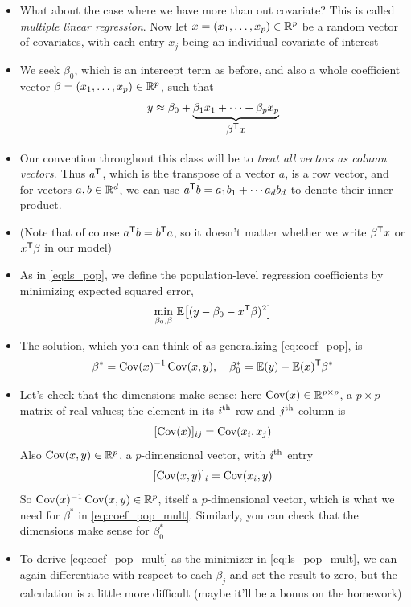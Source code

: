 \documentclass{article}
\begin{document}
\begin{itemize}
\item What about the case where we have more than out covariate? This is called
  \emph{multiple linear regression}. Now let $x = (x_1, \dots, x_p) \in \mathbb{R}^p$
  be a random vector of covariates, with each entry $x_j$ being an individual
  covariate of interest

\item We seek $\beta_0$, which is an intercept term as before, and also a whole 
  coefficient vector $\beta = (x_1, \dots, x_p) \in \mathbb{R}^p$, such that 
  \[
  y \approx \beta_0 + \underbrace{\beta_1 x_1 + \cdots + \beta_p
    x_p}_{\textstyle \begin{array}{c} \beta^{\mathsf{T}} x \end{array}}
  \]

\item Our convention throughout this class will be to \emph{treat all vectors as 
    column vectors}. Thus $a^{\mathsf{T}}$, which is the transpose of a vector $a$, is a
  row vector, and for vectors $a,b \in \mathbb{R}^d$, we can use $a^{\mathsf{T}} b = a_1 b_1 +
  \cdots a_d b_d$ to denote their inner product. 

\item (Note that of course $a^{\mathsf{T}} b = b^{\mathsf{T}} a$, so it doesn't matter whether we
  write $\beta^{\mathsf{T}} x$ or $x^{\mathsf{T}} \beta$ in our model)

\item As in \eqref{eq:ls_pop}, we define the population-level regression
  coefficients by minimizing expected squared error,   
  \begin{equation}
  \label{eq:ls_pop_mult}
  \min_{\beta_0, \beta} \, \mathbb{E}\big[ (y - \beta_0 - x^{\mathsf{T}} \beta)^2 \big]
  \end{equation}

\item The solution, which you can think of as generalizing \eqref{eq:coef_pop},
  is 
  \begin{equation}
  \label{eq:coef_pop_mult}
  \beta^* = \operatorname{Cov}(x)^{-1} \operatorname{Cov}(x, y), \quad 
  \beta^*_0 = \mathbb{E}(y) - \mathbb{E}(x)^{\mathsf{T}} \beta^*
  \end{equation}

\item Let's check that the dimensions make sense: here $\operatorname{Cov}(x) \in \mathbb{R}^{p
    \times  p}$, a $p \times p$ matrix of real values; the element in its $i^{\textnormal{th}}$
  row and $j^{\textnormal{th}}$ column is   
  \[
  [\operatorname{Cov}(x)]_{ij} = \operatorname{Cov}(x_i, x_j)
  \]
  Also $\operatorname{Cov}(x, y) \in \mathbb{R}^p$, a $p$-dimensional vector, with $i^{\textnormal{th}}$ entry
  \[
  [\operatorname{Cov}(x, y)]_i = \operatorname{Cov}(x_i, y)
  \]
  So $\operatorname{Cov}(x)^{-1} \operatorname{Cov}(x, y) \in \mathbb{R}^p$, itself a $p$-dimensional vector, which
  is what we need for $\beta^*$ in \eqref{eq:coef_pop_mult}. Similarly, you can
  check that the dimensions make sense for $\beta^*_0$ 

\item To derive \eqref{eq:coef_pop_mult} as the minimizer in
  \eqref{eq:ls_pop_mult}, we can again differentiate with respect to each
  $\beta_j$ and set the result to zero, but the calculation is a little more
  difficult (maybe it'll be a bonus on the homework) 
\end{itemize}
\end{document}
